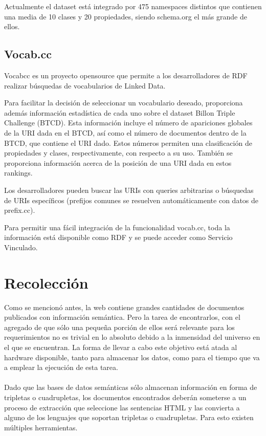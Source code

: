 Actualmente el dataset está integrado por 475 namespaces distintos que contienen una media de 10 clases y 20 propiedades, siendo schema.org el más grande de ellos.

\subsection{Vocab.cc}
Vocabcc es un proyecto opensource que permite a los desarrolladores de RDF realizar búsquedas de vocabularios de Linked Data.

Para facilitar la decisión de seleccionar un vocabulario deseado, proporciona además información estadística de cada uno sobre el dataset Billon Triple Challenge (BTCD)\cite{btc-2012}. 
 Esta información incluye el número de apariciones globales de la URI dada en el BTCD, así como el número de documentos dentro de la BTCD, que contiene el URI dado. Estos números permiten una clasificación de propiedades y clases, respectivamente, con respecto a su uso. También se proporciona información acerca de la posición de una URI dada en estos rankings.

Los desarrolladores pueden buscar las URIs con queries arbitrarias o búsquedas de URIs específicos (prefijos comunes se resuelven automáticamente con datos de prefix.cc).

Para permitir una fácil integración de la funcionalidad vocab.cc, toda la información está disponible como RDF y se puede acceder como Servicio Vinculado.

\section{Recolección}
\label{section:recoleccion}
%
Como se mencionó antes, la web contiene grandes cantidades de documentos publicados con información semántica. Pero la tarea
de encontrarlos, con el agregado de que sólo una pequeña porción de ellos será relevante para los requerimientos no es trivial
en lo absoluto debido a la inmensidad del universo en el que se encuentran. La forma de llevar a cabo este objetivo está 
atada al hardware disponible, tanto para almacenar los datos, como para el tiempo que va a emplear la ejecución de esta 
tarea.  
\\\\
Dado que las bases de datos semánticas sólo almacenan información en forma de tripletas o cuadrupletas, los documentos encontrados 
deberán someterse a un proceso de extracción que seleccione las sentencias HTML y las convierta a alguno de los lenguajes que soportan  
tripletas o cuadrupletas. Para esto existen múltiples herramientas. 


